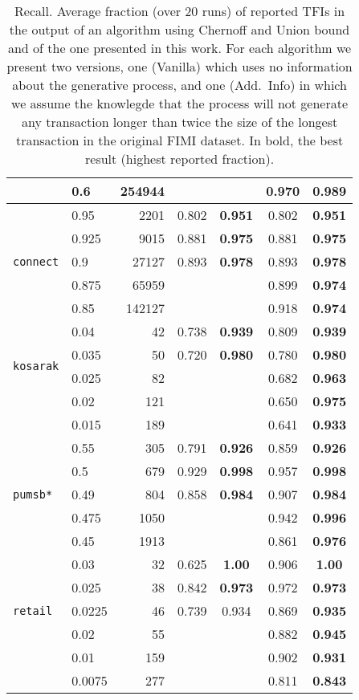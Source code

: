 \begin{table*}[tbp]
\begin{tabular}{llrcccc}
 & 0.6 & 254944 & &  & 0.970& \bf 0.989\\
\midrule
\multirow{5}{*}{\texttt{connect}} & 0.95 & 2201 & 0.802& \bf 0.951&
0.802& \bf 0.951\\
 & 0.925 & 9015 & 0.881& \bf 0.975& 0.881& \bf 0.975 \\
 & 0.9 & 27127 & 0.893& \bf 0.978& 0.893& \bf 0.978\\
 & 0.875 & 65959 & &  & 0.899& \bf 0.974\\
 & 0.85 & 142127 & &  & 0.918& \bf 0.974\\
\midrule
\multirow{4}{*}{\texttt{kosarak}} & 0.04 & 42 & 0.738& \bf 0.939&
0.809& \bf 0.939\\
 & 0.035 & 50 & 0.720& \bf 0.980& 0.780& \bf 0.980\\
 & 0.025 & 82 & &  & 0.682& \bf0.963\\
 & 0.02 & 121 & &  & 0.650& \bf 0.975\\
 & 0.015 & 189 & &  & 0.641& \bf 0.933\\
\midrule
\multirow{5}{*}{\texttt{pumsb*}} & 0.55 & 305 & 0.791& \bf 0.926&
0.859& \bf 0.926\\
 & 0.5 & 679 & 0.929& \bf 0.998& 0.957& \bf 0.998\\
 & 0.49 & 804 & 0.858& \bf 0.984& 0.907& \bf 0.984\\
 & 0.475 & 1050 & &  & 0.942& \bf 0.996\\
 & 0.45 & 1913 & &  & 0.861& \bf 0.976\\
\midrule
\multirow{5}{*}{\texttt{retail}} & 0.03 & 32 & 0.625& \bf 1.00&
0.906& \bf 1.00\\
 & 0.025 & 38 & 0.842& \bf 0.973& 0.972& \bf 0.973\\
 & 0.0225 & 46 & 0.739& 0.934& 0.869& \bf 0.935\\
 & 0.02 & 55 & &  & 0.882& \bf 0.945\\
 & 0.01 & 159 & &  & 0.902& \bf 0.931\\
 & 0.0075 & 277 & &  & 0.811& \bf 0.843\\
 \bottomrule
 \end{tabular}
  \caption{Recall. Average fraction (over 20 runs) of reported TFIs
  in the output of an algorithm using Chernoff and Union bound and of the one
  presented in this work. For each algorithm we present two versions, one
  (Vanilla) which uses no information about the generative process, and one
  (Add.~Info) in which we assume the knowlegde that the process will not
  generate any transaction longer than twice the size of the longest transaction
  in the original FIMI dataset. In bold, the best result (highest reported
  fraction).}
\label{table:power}
\end{table*}
